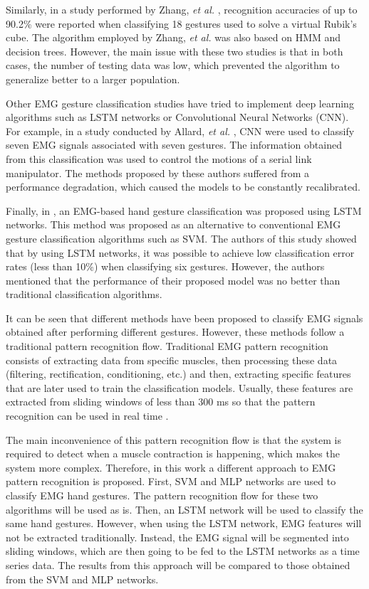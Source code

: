 \documentclass[journal]{IEEEtran}
\newcommand{\etal}{\emph{et al.}}
\begin{document}
Similarly, in a study performed by Zhang, \etal{} \cite{zhang2011}, recognition accuracies of up to 90.2\% were reported when classifying 18 gestures used to solve a virtual Rubik’s cube. The algorithm employed by Zhang, \etal{} was also based on HMM and decision trees. However, the main issue with these two studies is that in both cases, the number of testing data was low, which prevented the algorithm to generalize better to a larger population. 

Other EMG gesture classification studies have tried to implement deep learning algorithms such as LSTM networks or Convolutional Neural Networks (CNN). For example, in a study conducted by Allard, \etal{} \cite{allard2016}, CNN were used to classify seven EMG signals associated with seven gestures. The information obtained from this classification was used to control the motions of a serial link manipulator. The methods proposed by these authors suffered from a performance degradation, which caused the models to be constantly recalibrated. 

Finally, in \cite{jabbari2020}, an EMG-based hand gesture classification was proposed using LSTM networks. This method was proposed as an alternative to conventional EMG gesture classification algorithms such as SVM. The authors of this study showed that by using LSTM networks, it was possible to achieve low classification error rates (less than 10\%) when classifying six gestures. However, the authors mentioned that the performance of their proposed model was no better than traditional classification algorithms.

It can be seen that different methods have been proposed to classify EMG signals obtained after performing different gestures. However, these methods follow a traditional pattern recognition flow. Traditional EMG pattern recognition consists of extracting data from specific muscles, then processing these data (filtering, rectification, conditioning, etc.) and then, extracting specific features that are later used to train the classification models. Usually, these features are extracted from sliding windows of less than 300 ms so that the pattern recognition can be used in real time \cite{englehart2003}. 

The main inconvenience of this pattern recognition flow is that the system is required to detect when a muscle contraction is happening, which makes the system more complex. Therefore, in this work a different approach to EMG pattern recognition is proposed. First, SVM and MLP networks are used to classify EMG hand gestures. The pattern recognition flow for these two algorithms will be used as is. Then, an LSTM network will be used to classify the same hand gestures. However, when using the LSTM network, EMG features will not be extracted traditionally. Instead, the EMG signal will be segmented into sliding windows, which are then going to be fed to the LSTM networks as a time series data. The results from this approach will be compared to those obtained from the SVM and MLP networks.
\end{document}
